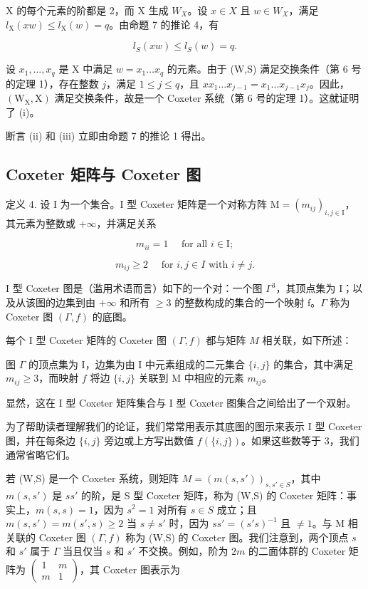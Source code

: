 X 的每个元素的阶都是 2，而 X 生成 \(W_{X}\)。设 \(x \in X\) 且 \(w \in W_{X}\)，满足 \(l_{\mathrm{X}}(xw) \leqslant l_{\mathrm{X}}(w) = q\)。由命题 7 的推论 4，有

\[
l _ {S} (x w) \leqslant l _ {S} (w) = q.
\]

设 \(x_{1},\ldots ,x_{q}\) 是 X 中满足 \(w = x_{1}\dots x_{q}\) 的元素。由于 (W,S) 满足交换条件（第 6 号的定理 1），存在整数 \(j\)，满足 \(1\leqslant j\leqslant q\)，且 \(xx_{1}\ldots x_{j - 1} = x_{1}\ldots x_{j - 1}x_{j}\)。因此，\((\mathrm{W_X},\mathrm{X})\) 满足交换条件，故是一个 Coxeter 系统（第 6 号的定理 1）。这就证明了 (i)。

断言 (ii) 和 (iii) 立即由命题 7 的推论 1 得出。

\subsection{Coxeter 矩阵与 Coxeter 图}

定义 4. 设 I 为一个集合。I 型 Coxeter 矩阵是一个对称方阵 \(\mathrm{M} = (m_{ij})_{i,j\in \mathrm{I}}\)，其元素为整数或 \(+\infty\)，并满足关系

\[
m _ {i i} = 1 \quad \text {   for   all   } i \in \mathrm{I};\tag{25}
\]

\[
m _ {i j} \geqslant 2 \quad \text {   for   } i, j \in I \text {   with   } i \neq j.\tag{26}
\]

I 型 Coxeter 图是（滥用术语而言）如下的一个对：一个图 \(\Gamma^{3}\)，其顶点集为 I；以及从该图的边集到由 \(+\infty\) 和所有 \(\geqslant 3\) 的整数构成的集合的一个映射 f。\(\Gamma\) 称为 Coxeter 图 \((\Gamma, f)\) 的底图。

每个 I 型 Coxeter 矩阵的 Coxeter 图 \((\Gamma, f)\) 都与矩阵 \(M\) 相关联，如下所述：

图 \(\Gamma\) 的顶点集为 I，边集为由 I 中元素组成的二元集合 \(\{i,j\}\) 的集合，其中满足 \(m_{ij} \geqslant 3\)，而映射 \(f\) 将边 \(\{i,j\}\) 关联到 M 中相应的元素 \(m_{ij}\)。

显然，这在 I 型 Coxeter 矩阵集合与 I 型 Coxeter 图集合之间给出了一个双射。

为了帮助读者理解我们的论证，我们常常用表示其底图的图示来表示 I 型 Coxeter 图，并在每条边 \(\{i,j\}\) 旁边或上方写出数值 \(f(\{i,j\})\)。如果这些数等于 3，我们通常省略它们。

若 (W,S) 是一个 Coxeter 系统，则矩阵 \(M = (m(s,s'))_{s,s' \in S}\)，其中 \(m(s,s')\) 是 \(ss'\) 的阶，是 S 型 Coxeter 矩阵，称为 (W,S) 的 Coxeter 矩阵：事实上，\(m(s,s) = 1\)，因为 \(s^2 = 1\) 对所有 \(s \in S\) 成立；且 \(m(s,s') = m(s',s) \geqslant 2\) 当 \(s \neq s'\) 时，因为 \(ss' = (s's)^{-1}\) 且 \(\neq 1\)。与 M 相关联的 Coxeter 图 \((\Gamma, f)\) 称为 (W,S) 的 Coxeter 图。我们注意到，两个顶点 \(s\) 和 \(s'\) 属于 \(\Gamma\) 当且仅当 \(s\) 和 \(s'\) 不交换。例如，阶为 \(2m\) 的二面体群的 Coxeter 矩阵为 \(\begin{pmatrix} 1 & m \\ m & 1 \end{pmatrix}\)，其 Coxeter 图表示为

